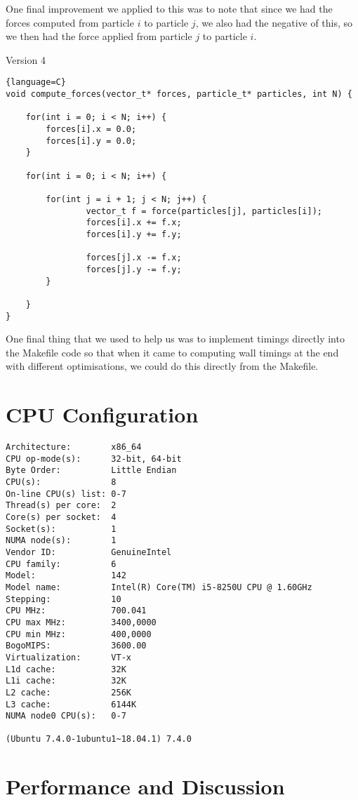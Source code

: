 \documentclass[12pt]{article}
\begin{document}
One final improvement we applied to this was to note that since we had the forces computed from particle $i$ to particle $j$, we also had the negative of this, so we then had the force applied from particle $j$ to particle $i$. 
\begin{center}
    Version 4
\end{center}
\begin{lstlisting}{language=C}
void compute_forces(vector_t* forces, particle_t* particles, int N) {

    for(int i = 0; i < N; i++) {
        forces[i].x = 0.0;
        forces[i].y = 0.0;
    }
    
    for(int i = 0; i < N; i++) {
        
        for(int j = i + 1; j < N; j++) {
                vector_t f = force(particles[j], particles[i]);
                forces[i].x += f.x;
                forces[i].y += f.y;

                forces[j].x -= f.x;
                forces[j].y -= f.y;
        }
        
    }
}
\end{lstlisting}
One final thing that we used to help us was to implement timings directly into the Makefile code so that when it came to computing wall timings at the end with different optimisations, we could do this directly from the Makefile. 
\section{CPU Configuration}
\begin{verbatim}
Architecture:        x86_64
CPU op-mode(s):      32-bit, 64-bit
Byte Order:          Little Endian
CPU(s):              8
On-line CPU(s) list: 0-7
Thread(s) per core:  2
Core(s) per socket:  4
Socket(s):           1
NUMA node(s):        1
Vendor ID:           GenuineIntel
CPU family:          6
Model:               142
Model name:          Intel(R) Core(TM) i5-8250U CPU @ 1.60GHz
Stepping:            10
CPU MHz:             700.041
CPU max MHz:         3400,0000
CPU min MHz:         400,0000
BogoMIPS:            3600.00
Virtualization:      VT-x
L1d cache:           32K
L1i cache:           32K
L2 cache:            256K
L3 cache:            6144K
NUMA node0 CPU(s):   0-7

(Ubuntu 7.4.0-1ubuntu1~18.04.1) 7.4.0

\end{verbatim}
\newpage
\section{Performance and Discussion}
\end{document}
